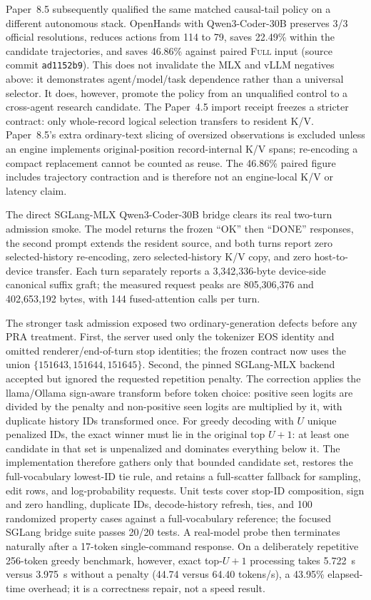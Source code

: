 \documentclass[11pt]{article}
\begin{document}
Paper~8.5 subsequently qualified the same matched causal-tail policy on a
different autonomous stack.  OpenHands with Qwen3-Coder-30B preserves 3/3
official resolutions, reduces actions from 114 to 79, saves 22.49\% within the
candidate trajectories, and saves 46.86\% against paired \textsc{Full} input
(source commit \texttt{ad1152b9}).  This does not invalidate the MLX and vLLM
negatives above: it demonstrates agent/model/task dependence rather than a
universal selector.  It does, however, promote the policy from an unqualified
control to a cross-agent research candidate.  The Paper~4.5 import receipt
freezes a stricter contract: only whole-record logical selection transfers to
resident K/V.  Paper~8.5's extra ordinary-text slicing of oversized
observations is excluded unless an engine implements original-position
record-internal K/V spans; re-encoding a compact replacement cannot be counted
as reuse.  The 46.86\% paired figure includes trajectory contraction and is
therefore not an engine-local K/V or latency claim.

The direct SGLang-MLX Qwen3-Coder-30B bridge clears its real two-turn admission
smoke.  The model returns the frozen
``OK'' then ``DONE'' responses, the second prompt extends the resident source,
and both turns report zero selected-history re-encoding, zero selected-history
K/V copy, and zero host-to-device transfer.  Each turn separately reports a
3,342,336-byte device-side canonical suffix graft; the measured request peaks
are 805,306,376 and 402,653,192 bytes, with 144 fused-attention calls per turn.

The stronger task admission exposed two ordinary-generation defects before any
PRA treatment.  First, the server used only the tokenizer EOS identity and
omitted renderer/end-of-turn stop identities; the frozen contract now uses the
union $\{151643,151644,151645\}$.  Second, the pinned SGLang-MLX backend accepted
but ignored the requested repetition penalty.  The correction applies the
llama/Ollama sign-aware transform before token choice: positive seen logits are
divided by the penalty and non-positive seen logits are multiplied by it, with
duplicate history IDs transformed once.  For greedy decoding with $U$ unique
penalized IDs, the exact winner must lie in the original top $U+1$: at least one
candidate in that set is unpenalized and dominates everything below it.  The
implementation therefore gathers only that bounded candidate set, restores the
full-vocabulary lowest-ID tie rule, and retains a full-scatter fallback for
sampling, edit rows, and log-probability requests.  Unit tests cover stop-ID
composition, sign and zero handling, duplicate IDs, decode-history refresh,
ties, and 100 randomized property cases against a full-vocabulary reference;
the focused SGLang bridge suite passes 20/20 tests.  A real-model probe then
terminates naturally after a 17-token single-command response.  On a deliberately
repetitive 256-token greedy benchmark, however, exact top-$U+1$ processing takes
5.722~s versus 3.975~s without a penalty (44.74 versus 64.40 tokens/s), a 43.95\%
elapsed-time overhead; it is a correctness repair, not a speed result.
\end{document}
